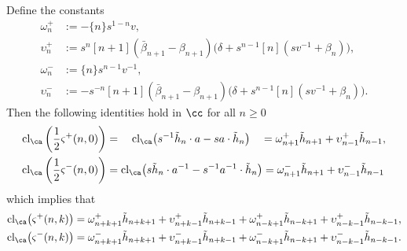 \begin{lemma} \label{lemma:skewclosures}
Define the constants
\begin{align*}
\omega_{n}^+ &:= - \{n\} s^{1-n} v, \\
\upsilon_{n}^+ &:= s^{n} [n+1] (\bar{\beta}_{n+1} - \beta_{n+1} ) \big( \delta + s^{n-1} [n] ( s v^{-1} + \beta_{n} ) \big), \\
\omega_{n}^- &:= \{n\} s^{n-1} v^{-1}, \\
\upsilon_{n}^- &:= -s^{-n} [n+1] ( \bar{\beta}_{n+1} - \beta_{n+1} ) \big( \delta + s^{n-1} [n] ( s v^{-1} + \beta_{n} ) \big).
\end{align*}
Then the following identities hold in $\cc$ for all $n \geq 0$ 
\begin{align*}
\textrm{cl}_\ca \left( \frac{1}{2} \varsigma^+(n,0) \right) &= \quad \textrm{cl}_\ca \big( s^{-1} \tilde{h}_n \cdot a - s a \cdot \tilde{h}_n \big) \quad = \omega_{n+1}^+ \tilde{h}_{n+1} + \upsilon_{n-1}^+ \tilde{h}_{n-1}, \\
\textrm{cl}_\ca \left( \frac{1}{2} \varsigma^-(n,0) \right) &=\textrm{cl}_\ca \big( s \tilde{h}_n \cdot a^{-1} - s^{-1} a^{-1} \cdot \tilde{h}_n \big) = \omega_{n+1}^- \tilde{h}_{n+1} + \upsilon_{n-1}^- \tilde{h}_{n-1}
\end{align*}
which implies that
\begin{align*}
\textrm{cl}_\ca \big( \varsigma^+ (n, k) \big) &= \omega_{n+k+1}^+ \tilde{h}_{n+k+1} + \upsilon_{n+k-1}^+ \tilde{h}_{n+k-1} + \omega_{n-k+1}^+ \tilde{h}_{n-k+1} + \upsilon_{n-k-1}^+ \tilde{h}_{n-k-1}, \\
\textrm{cl}_\ca \big( \varsigma^- (n, k) \big) &= \omega_{n+k+1}^- \tilde{h}_{n+k+1} + \upsilon_{n+k-1}^- \tilde{h}_{n+k-1} + \omega_{n-k+1}^- \tilde{h}_{n-k+1} + \upsilon_{n-k-1}^- \tilde{h}_{n-k-1}.
\end{align*}
\end{lemma}
